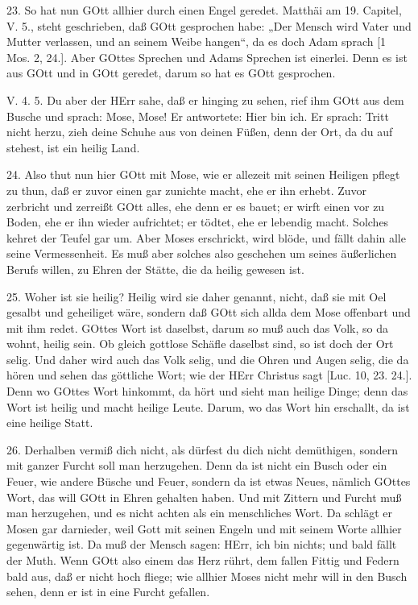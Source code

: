 23. So hat nun GOtt allhier durch einen Engel geredet. Matthäi am 19. Capitel, V. 5., steht geschrieben, daß GOtt gesprochen habe: „Der Mensch wird Vater und Mutter verlassen, und an seinem Weibe hangen“, da es doch Adam sprach [1 Mos. 2, 24.]. Aber GOttes Sprechen und Adams Sprechen ist einerlei. Denn es ist aus GOtt und in GOtt geredet, darum so hat es GOtt gesprochen.

\begin{schriftzitat}
V. 4. 5. Du aber der HErr sahe, daß er hinging zu sehen, rief ihm GOtt aus dem Busche und sprach: Mose, Mose! Er antwortete: Hier bin ich. Er sprach: Tritt nicht herzu, zieh deine Schuhe aus von deinen Füßen, denn der Ort, da du auf stehest, ist ein heilig Land.
\end{schriftzitat}

24. Also thut nun hier GOtt mit Mose, wie er allezeit mit seinen Heiligen pflegt zu thun, daß er zuvor einen gar zunichte macht, ehe er ihn erhebt. Zuvor zerbricht und zerreißt GOtt alles, ehe denn er es bauet; er wirft einen vor zu Boden, ehe er ihn wieder aufrichtet; er tödtet, ehe er lebendig macht. Solches kehret der Teufel gar um. Aber Moses erschrickt, wird blöde, und fällt dahin alle seine Vermessenheit. Es muß aber solches also geschehen um seines äußerlichen Berufs willen, zu Ehren der Stätte, die da heilig gewesen ist.

25. Woher ist sie heilig? Heilig wird sie daher genannt, nicht, daß sie mit Oel gesalbt und geheiliget wäre, sondern daß GOtt sich allda dem Mose offenbart und mit ihm redet. GOttes Wort ist daselbst, darum so muß auch das Volk, so da wohnt, heilig sein. Ob gleich gottlose Schäfle daselbst sind, so ist doch der Ort selig. Und daher wird auch das Volk selig, und die Ohren und Augen selig, die da hören und sehen das göttliche Wort; wie der HErr Christus sagt [Luc. 10, 23. 24.]. Denn wo GOttes Wort hinkommt, da hört und sieht man heilige Dinge; denn das Wort ist heilig und macht heilige Leute. Darum, wo das Wort hin erschallt, da ist eine heilige Statt.

26. Derhalben vermiß dich nicht, als dürfest du dich nicht demüthigen, sondern mit ganzer Furcht soll man herzugehen. Denn da ist nicht ein Busch oder ein Feuer, wie andere Büsche und Feuer, sondern da ist etwas Neues, nämlich GOttes Wort, das will GOtt in Ehren gehalten haben. Und mit Zittern und Furcht muß man herzugehen, und es nicht achten als ein menschliches Wort. Da schlägt er Mosen gar darnieder, weil Gott mit seinen Engeln und mit seinem Worte allhier gegenwärtig ist. Da muß der Mensch sagen: HErr, ich bin nichts; und bald fällt der Muth. Wenn GOtt also einem das Herz rührt, dem fallen Fittig und Federn bald aus, daß er nicht hoch fliege; wie allhier Moses nicht mehr will in den Busch sehen, denn er ist in eine Furcht gefallen.

